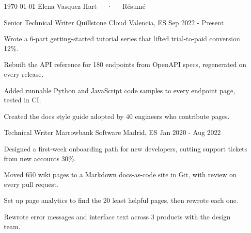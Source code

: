 \documentclass[11pt, a4paper]{awesome-cv}
\begin{document}
\makecvheader[C]

\makecvfooter
  {\today}
  {Elena Vasquez-Hart~~~·~~~Résumé}
  {\thepage}


\begin{cventries}

  \cventry
    {Senior Technical Writer} %
    {Quillstone Cloud} %
    {Valencia, ES} %
    {Sep 2022 - Present} %
    {
      \begin{cvitems} %
        \item {Wrote a 6-part getting-started tutorial series that lifted trial-to-paid conversion 12\%.} %
        \item {Rebuilt the API reference for 180 endpoints from OpenAPI specs, regenerated on every release.} %
        \item {Added runnable Python and JavaScript code samples to every endpoint page, tested in CI.} %
        \item {Created the docs style guide adopted by 40 engineers who contribute pages.} %
      \end{cvitems}
    }

  \cventry
    {Technical Writer} %
    {Marrowbank Software} %
    {Madrid, ES} %
    {Jan 2020 - Aug 2022} %
    {
      \begin{cvitems} %
        \item {Designed a first-week onboarding path for new developers, cutting support tickets from new accounts 30\%.} %
        \item {Moved 650 wiki pages to a Markdown docs-as-code site in Git, with review on every pull request.} %
        \item {Set up page analytics to find the 20 least helpful pages, then rewrote each one.} %
        \item {Rewrote error messages and interface text across 3 products with the design team.} %
      \end{cvitems}
    }


\end{cventries}
\end{document}
